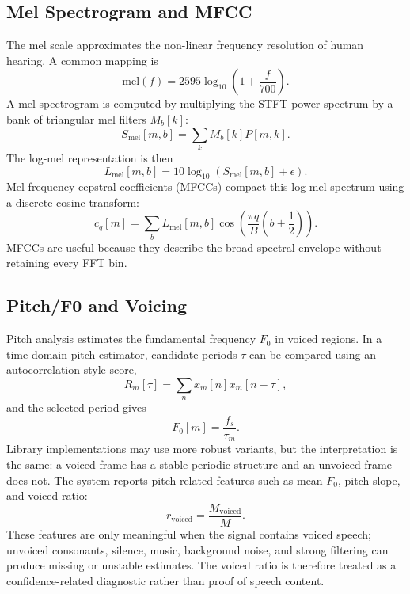 ﻿\documentclass[11pt,a4paper]{article}
\begin{document}
\subsection{Mel Spectrogram and MFCC}
The mel scale approximates the non-linear frequency resolution of human hearing. A common mapping is
\begin{equation}
    \mathrm{mel}(f) = 2595\log_{10}\left(1+\frac{f}{700}\right).
\end{equation}
A mel spectrogram is computed by multiplying the STFT power spectrum by a bank of triangular mel filters $M_b[k]$:
\begin{equation}
    S_{\mathrm{mel}}[m,b] = \sum_k M_b[k]P[m,k].
\end{equation}
The log-mel representation is then
\begin{equation}
    L_{\mathrm{mel}}[m,b] = 10\log_{10}(S_{\mathrm{mel}}[m,b]+\epsilon).
\end{equation}
Mel-frequency cepstral coefficients (MFCCs) compact this log-mel spectrum using a discrete cosine transform:
\begin{equation}
    c_q[m] = \sum_b L_{\mathrm{mel}}[m,b]\cos\left(\frac{\pi q}{B}\left(b+\frac{1}{2}\right)\right).
\end{equation}
MFCCs are useful because they describe the broad spectral envelope without retaining every FFT bin.

\subsection{Pitch/F0 and Voicing}
Pitch analysis estimates the fundamental frequency $F_0$ in voiced regions. In a time-domain pitch estimator, candidate periods $\tau$ can be compared using an autocorrelation-style score,
\begin{equation}
    R_m[\tau] = \sum_n x_m[n]x_m[n-\tau],
\end{equation}
and the selected period gives
\begin{equation}
    F_0[m] = \frac{f_s}{\tau_m}.
\end{equation}
Library implementations may use more robust variants, but the interpretation is the same: a voiced frame has a stable periodic structure and an unvoiced frame does not. The system reports pitch-related features such as mean $F_0$, pitch slope, and voiced ratio:
\begin{equation}
    r_{\mathrm{voiced}} = \frac{M_{\mathrm{voiced}}}{M}.
\end{equation}
These features are only meaningful when the signal contains voiced speech; unvoiced consonants, silence, music, background noise, and strong filtering can produce missing or unstable estimates. The voiced ratio is therefore treated as a confidence-related diagnostic rather than proof of speech content.
\end{document}

